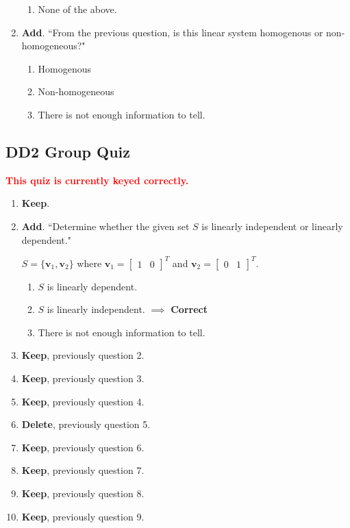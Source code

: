 \documentclass[fleqn]{article}[11pt]
\begin{document}
\begin{enumerate}
\begin{enumerate}
				\item None of the above.
			\end{enumerate}
	\item \textbf{Add}. ``From the previous question, is this linear system homogenous or non-homogeneous?"
	
		\begin{enumerate}
			\item Homogenous
			\item Non-homogeneous
			\item There is not enough information to tell.
		\end{enumerate}
\end{enumerate}

\subsection*{DD2 Group Quiz}

\textcolor{red}{\textbf{This quiz is currently keyed correctly.}}

\begin{enumerate}
	\item \textbf{Keep}.
	\item \textbf{Add}. ``Determine whether the given set $S$ is linearly independent or linearly dependent."
	
	\(S=\{\mathbf{v}_{1},\mathbf{v}_{2}\}\) where \(\mathbf{v}_{1}= \begin{bmatrix} 1 & 0 \end{bmatrix}^{T}\) and \(\mathbf{v}_{2}= \begin{bmatrix} 0 & 1 \end{bmatrix}^{T}\).
	
		\begin{enumerate}
			\item $S$ is linearly dependent.
			\item $S$ is linearly independent. $\implies$ \textbf{Correct}
			\item There is not enough information to tell.
		\end{enumerate}
	\item \textbf{Keep}, previously question 2.
	\item \textbf{Keep}, previously question 3.
	\item \textbf{Keep}, previously question 4. 
	\item \textbf{Delete}, previously question 5.
	\item \textbf{Keep}, previously question 6.
	\item \textbf{Keep}, previously question 7.
	\item \textbf{Keep}, previously question 8.
	\item \textbf{Keep}, previously question 9.	 
\end{enumerate}
\end{document}
